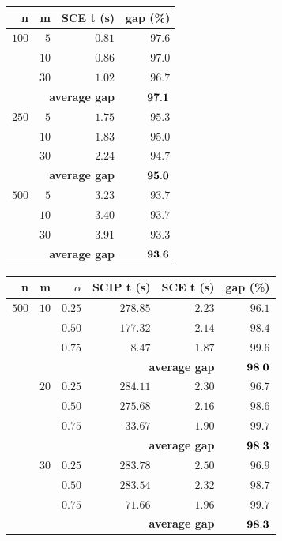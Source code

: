 \documentclass[a0,portrait]{a0poster}
\begin{document}
\begin{multicols}{2}
\begin{minipage}[t]{0.5\linewidth}
\hspace{3cm}
\begin{tabular}{|r|r|rr|} \hline
\textbf{n}   & \textbf{m}  & \textbf{SCE t (s)} & \textbf{gap (\%)} \\ \hline
   $100$ & $5$  & $0.81$ & $97.6$ \\
	   & $10$ & $0.86$ & $97.0$ \\
	   & $30$ & $1.02$ & $96.7$ \\ \cline{2-4}
    & \multicolumn{2}{r}{{\bf average gap}}  & $\bf 97.1$  \\ \hline
   $250$ & $5$  & $1.75$ & $95.3$ \\
	   & $10$ & $1.83$ & $95.0$ \\
	   & $30$ & $2.24$ & $94.7$ \\ \cline{2-4}
    & \multicolumn{2}{r}{{\bf average gap}}  & $\bf 95.0$  \\ \hline
   $500$ & $5$  & $3.23$ & $93.7$ \\
	   & $10$ & $3.40$ & $93.7$ \\
	   & $30$ & $3.91$ & $93.3$ \\ \cline{2-4}
    & \multicolumn{2}{r}{{\bf average gap}}  & $\bf 93.6$  \\ \hline
\end{tabular}
 \label{tab:chu}
\end{minipage}
\begin{minipage}[t]{0.5\linewidth}
\centering
\begin{tabular}[c]{|r|r|r|rrr|} \hline
\textbf{n}   & \textbf{m}  & \textbf{$\alpha$}    &\textbf{SCIP t (s)}& \textbf{SCE t (s)} & \textbf{gap (\%)} \\ \hline
$500$ & $10$ & $0.25$ & $278.85$ & $  2.23$  & $96.1$ \\
    &    & $0.50$ & $177.32$ & $  2.14$  & $98.4$ \\
    &    & $0.75$ & $  8.47$ & $  1.87$  & $99.6$ \\ \cline{2-6}
    & \multicolumn{4}{r}{\textbf{average gap}}  & $\bf 98.0$  \\ \hline
    & $20$ & $0.25$ & $284.11$ & $  2.30$  & $96.7$ \\
    &    & $0.50$ & $275.68$ & $  2.16$  & $98.6$ \\
    &    & $0.75$ & $ 33.67$ & $  1.90$  & $99.7$ \\ \cline{2-6}
    & \multicolumn{4}{r}{\textbf{average gap}}  & $\bf 98.3$  \\ \hline
    & $30$ & $0.25$ & $283.78$ & $  2.50$  & $96.9$ \\
    &    & $0.50$ & $283.54$ & $  2.32$  & $98.7$ \\
    &    & $0.75$ & $ 71.66$ & $  1.96$  & $99.7$ \\ \cline{2-6}
    & \multicolumn{4}{r}{\textbf{average gap}}  & $\bf 98.3$  \\ \hline
\end{tabular}
 \label{tab:rand}
\end{minipage}


\end{multicols}
\end{document}
